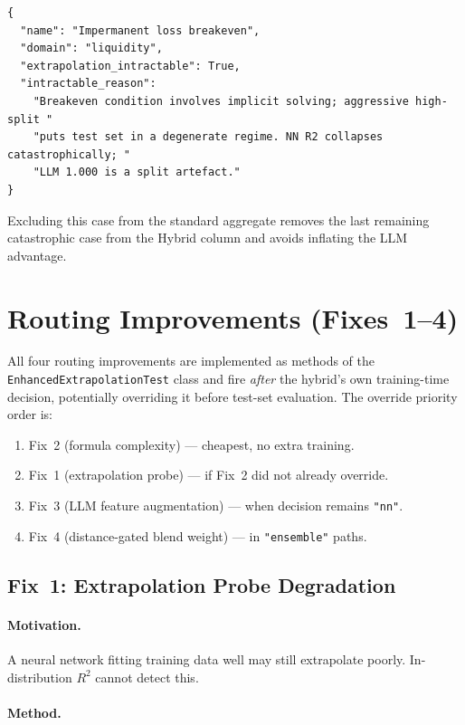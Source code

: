 \documentclass[twoside,11pt]{article}
\begin{document}
\begin{lstlisting}[caption={Intractable flag added to IL Breakeven catalogue entry.}]
{
  "name": "Impermanent loss breakeven",
  "domain": "liquidity",
  "extrapolation_intractable": True,
  "intractable_reason":
    "Breakeven condition involves implicit solving; aggressive high-split "
    "puts test set in a degenerate regime. NN R2 collapses catastrophically; "
    "LLM 1.000 is a split artefact."
}
\end{lstlisting}

Excluding this case from the standard aggregate removes the last remaining
catastrophic case from the Hybrid column and avoids inflating the LLM
advantage.

\section{Routing Improvements (Fixes~1--4)}
\label{sec:routing_fixes}

All four routing improvements are implemented as methods of the
\texttt{EnhancedExtrapolationTest} class and fire \emph{after} the hybrid's
own training-time decision, potentially overriding it before test-set
evaluation.  The override priority order is:

\begin{enumerate}
  \item Fix~2 (formula complexity) — cheapest, no extra training.
  \item Fix~1 (extrapolation probe) — if Fix~2 did not already override.
  \item Fix~3 (LLM feature augmentation) — when decision remains \texttt{"nn"}.
  \item Fix~4 (distance-gated blend weight) — in \texttt{"ensemble"} paths.
\end{enumerate}

\subsection{Fix~1: Extrapolation Probe Degradation}

\paragraph{Motivation.}
A neural network fitting training data well may still extrapolate poorly.
In-distribution $R^2$ cannot detect this.

\paragraph{Method.}
\end{document}

